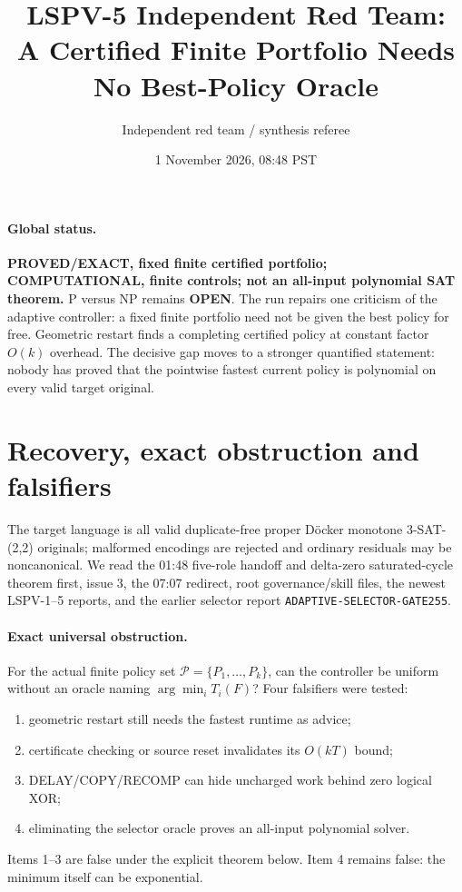 \documentclass[11pt]{article}
\title{LSPV-5 Independent Red Team:\\A Certified Finite Portfolio Needs No Best-Policy Oracle}
\author{Independent red team / synthesis referee}
\date{1 November 2026, 08:48 PST}
\newcommand{\OPEN}{\textbf{OPEN}}
\begin{document}
\maketitle

\paragraph{Global status.}
\textbf{PROVED/EXACT, fixed finite certified portfolio; COMPUTATIONAL, finite controls; not an all-input polynomial SAT theorem.}
P versus NP remains \OPEN.  The run repairs one criticism of the adaptive
controller: a fixed finite portfolio need not be given the best policy for
free.  Geometric restart finds a completing certified policy at constant
factor $O(k)$ overhead.  The decisive gap moves to a stronger quantified
statement: nobody has proved that the pointwise fastest current policy is
polynomial on every valid target original.

\section{Recovery, exact obstruction and falsifiers}
The target language is all valid duplicate-free proper D\"ocker monotone
3-SAT-(2,2) originals; malformed encodings are rejected and ordinary
residuals may be noncanonical.  We read the 01:48 five-role handoff and
delta-zero saturated-cycle theorem first, issue 3, the 07:07 redirect, root
governance/skill files, the newest LSPV-1--5 reports, and the earlier selector
report \texttt{ADAPTIVE-SELECTOR-GATE255}.

\paragraph{Exact universal obstruction.}
For the actual finite policy set $\mathcal P=\{P_1,\ldots,P_k\}$, can the
controller be uniform without an oracle naming
$\arg\min_i T_i(F)$?  Four falsifiers were tested:
\begin{enumerate}
\item geometric restart still needs the fastest runtime as advice;
\item certificate checking or source reset invalidates its $O(kT)$ bound;
\item DELAY/COPY/RECOMP can hide uncharged work behind zero logical XOR;
\item eliminating the selector oracle proves an all-input polynomial solver.
\end{enumerate}
Items 1--3 are false under the explicit theorem below.  Item 4 remains false:
the minimum itself can be exponential.
\end{document}
